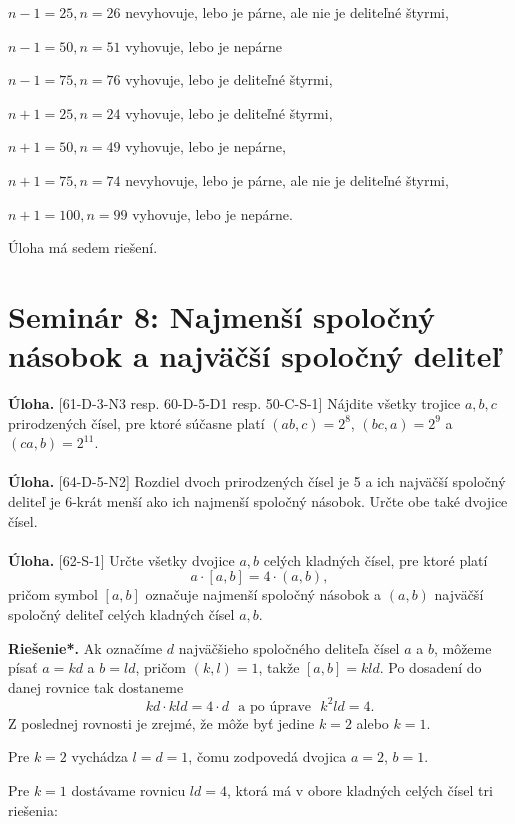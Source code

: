 \documentclass[11pt,a4paper,oneside,final]{book}
\newcommand{\ul}{\textbf{Úloha.} }
\newcommand{\rieh}{\textbf{Riešenie*.} }
\begin{document}
$n-1 = 25, n = 26$ nevyhovuje, lebo je párne, ale nie je deliteľné štyrmi,

$n-1 = 50, n = 51$ vyhovuje, lebo je nepárne

$n-1 = 75, n = 76$ vyhovuje, lebo je deliteľné štyrmi,

$n + 1 = 25, n = 24$ vyhovuje, lebo je deliteľné štyrmi,

$n + 1 = 50, n = 49$ vyhovuje, lebo je nepárne,

$n + 1 = 75, n = 74$ nevyhovuje, lebo je párne, ale nie je deliteľné štyrmi,

$n + 1 = 100, n = 99$ vyhovuje, lebo je nepárne.

Úloha má sedem riešení.

\section*{Seminár 8: Najmenší spoločný násobok a najväčší spoločný deliteľ}
\begin{tcolorbox}[breakable,notitle,boxrule=0pt,colback=light-gray,colframe=light-gray]\ul [61-D-3-N3 resp. 60-D-5-D1 resp. 50-C-S-1] Nájdite všetky trojice $a, b, c$ prirodzených čísel, pre ktoré súčasne platí $(ab, c) = 2^8$, $(bc, a) = 2^9$ a $(ca, b) = 2^{11}$. \\
\\
\ul [64-D-5-N2] Rozdiel dvoch prirodzených čísel je 5 a ich najväčší spoločný deliteľ je 6-krát menší ako ich najmenší spoločný násobok. Určte obe také dvojice čísel.\\
\\
\ul [62-S-1]
Určte všetky dvojice $a, b$ celých kladných čísel, pre ktoré platí
$$a \cdot [a, b] = 4 \cdot (a, b),$$
pričom symbol $[a, b]$ označuje najmenší spoločný násobok a $(a, b)$ najväčší spoločný deliteľ celých kladných čísel $a, b$.

\end{tcolorbox}

\rieh Ak označíme $d$ najväčšieho spoločného deliteľa čísel $a$ a $b$, môžeme písať $a = kd$ a $b = ld$, pričom $(k, l) = 1$, takže $[a, b] = kld$. Po dosadení do danej rovnice tak dostaneme
$$ kd \cdot kld = 4 \cdot d \ \ \ \text{a po úprave} \ \ \ k^2ld = 4.$$
Z poslednej rovnosti je zrejmé, že môže byť jedine $k = 2$ alebo $k = 1$.

Pre $k = 2$ vychádza $l = d = 1$, čomu zodpovedá dvojica $a = 2$, $b = 1$.

Pre $k = 1$ dostávame rovnicu $ld = 4$, ktorá má v obore kladných celých čísel tri riešenia:
\end{document}

